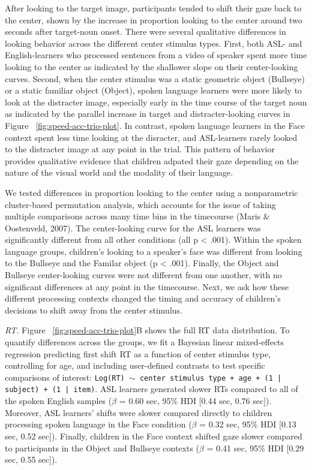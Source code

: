 \documentclass[english,floatsintext,man]{apa6}
\begin{document}
After looking to the target image, participants tended to shift their
gaze back to the center, shown by the increase in proportion looking to
the center around two seconds after target-noun onset. There were
several qualitative differences in looking behavior across the different
center stimulus types. First, both ASL- and English-learners who
processed sentences from a video of speaker spent more time looking to
the center as indicated by the shallower slope on their center-looking
curves. Second, when the center stimulus was a static geometric object
(Bullseye) or a static familiar object (Object), spoken language
learners were more likely to look at the distracter image, especially
early in the time course of the target noun as indicated by the parallel
increase in target and distracter-looking curves in Figure
~\ref{fig:speed-acc-trio-plot}. In contrast, spoken language learners in
the Face context spent less time looking at the disracter, and
ASL-learners rarely looked to the distracter image at any point in the
trial. This pattern of behavior provides qualitative evidence that
children adpated their gaze depending on the nature of the visual world
and the modality of their language.

We tested differences in proportion looking to the center using a
nonparametric cluster-based permutation analysis, which accounts for the
issue of taking multiple comparisons across many time bins in the
timecourse (Maris \& Oostenveld, 2007). The center-looking curve for the
ASL learners was significantly different from all other conditions (all
p \textless{} .001). Within the spoken language groups, children's
looking to a speaker's face was different from looking to the Bullseye
and the Familar object (p \textless{} .001). Finally, the Object and
Bullseye center-looking curves were not different from one another, with
no significant differences at any point in the timecourse. Next, we ask
how these different processing contexts changed the timing and accuracy
of children's decisions to shift away from the center stimulus.

\emph{RT.} Figure ~\ref{fig:speed-acc-trio-plot}B shows the full RT data
distribution. To quantify differences across the groups, we fit a
Bayesian linear mixed-effects regression predicting first shift RT as a
function of center stimulus type, controlling for age, and including
user-defined contrasts to test specific comparisons of interest:
\texttt{Log(RT) $\sim$ center stimulus type + age +  (1 | subject) + (1 | item)}.
ASL learners generated slower RTs compared to all of the spoken English
samples (\(\beta\) = 0.60 sec, 95\% HDI {[}0.44 sec, 0.76 sec{]}).
Moreover, ASL learners' shifts were slower compared directly to children
processing spoken language in the Face condition (\(\beta\) = 0.32 sec,
95\% HDI {[}0.13 sec, 0.52 sec{]}). Finally, children in the Face
context shifted gaze slower compared to participants in the Object and
Bullseye contexts (\(\beta\) = 0.41 sec, 95\% HDI {[}0.29 sec, 0.55
sec{]}).
\end{document}
